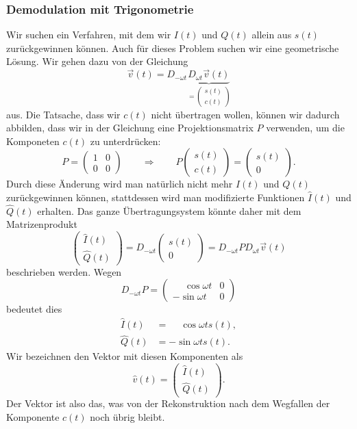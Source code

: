 \subsubsection{Demodulation mit Trigonometrie}
Wir suchen ein Verfahren, mit dem wir $I(t)$ und $Q(t)$ allein aus
$s(t)$ zurückgewinnen können.
Auch für dieses Problem suchen wir eine geometrische Lösung.
Wir gehen dazu von der Gleichung
\[
\vec{v}(t)
=
D_{-\omega t}\underbrace{D_{\omega t}
\vec{v}(t)}_{=\begin{pmatrix}s(t)\\c(t)\end{pmatrix}}
\]
aus.
Die Tatsache, dass wir $c(t)$ nicht übertragen wollen, können wir dadurch
abbilden, dass wir in der Gleichung eine Projektionsmatrix $P$
verwenden, um die Komponeten $c(t)$ zu unterdrücken:
\[
P=\begin{pmatrix}1&0\\0&0\end{pmatrix}
\qquad\Rightarrow\qquad
P\begin{pmatrix}s(t)\\c(t)\end{pmatrix}
=
\begin{pmatrix}s(t)\\0\end{pmatrix}.
\]
Durch diese Änderung wird man natürlich nicht mehr $I(t)$ und $Q(t)$ 
zurückgewinnen können, stattdessen wird man modifizierte Funktionen
$\hat{I}(t)$ und $\hat{Q}(t)$ erhalten.
Das ganze Übertragung\-system könnte daher mit dem Matrizenprodukt
\[
\begin{pmatrix}
\hat{I}(t)\\
\hat{Q}(t)
\end{pmatrix}
=
D_{-\omega t} \begin{pmatrix}s(t)\\0\end{pmatrix}
=
D_{-\omega t} P D_{\omega t}\vec{v}(t)
\]
beschrieben werden.
Wegen
\[
D_{-\omega t}P
=
\begin{pmatrix}
\phantom{-}\cos\omega t & 0 \\
         - \sin\omega t & 0
\end{pmatrix}
\]
bedeutet dies
\begin{align*}
\hat{I}(t) &= \phantom{-}\cos\omega t s(t),\\
\hat{Q}(t) &= -\sin\omega t s(t).
\end{align*}
Wir bezeichnen den Vektor mit diesen Komponenten als
\[
\hat{v}(t) = \begin{pmatrix}\hat{I}(t)\\\hat{Q}(t)\end{pmatrix}.
\]
Der Vektor ist also das, was von der Rekonstruktion nach dem Wegfallen
der Komponente $c(t)$ noch übrig bleibt.


